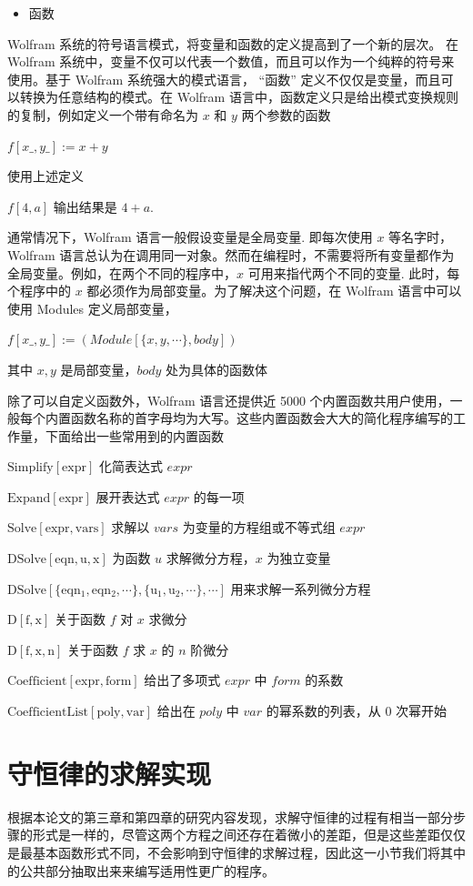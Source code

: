 \begin{itemize}
    \item 函数
\end{itemize}

Wolfram 系统的符号语言模式，将变量和函数的定义提高到了一个新的层次。 在 Wolfram 系统中，变量不仅可以代表一个数值，而且可以作为一个纯粹的符号来使用。基于 Wolfram 系统强大的模式语言， “函数” 定义不仅仅是变量，而且可以转换为任意结构的模式。在 Wolfram 语言中，函数定义只是给出模式变换规则的复制，例如定义一个带有命名为 $x$ 和 $y$ 两个参数的函数

$f[x\_ , y\_ ]:= x + y$

使用上述定义

$f[4, a]$ 输出结果是 $4 + a$.

通常情况下，Wolfram 语言一般假设变量是全局变量. 即每次使用  $x$ 等名字时，Wolfram 语言总认为在调用同一对象。然而在编程时，不需要将所有变量都作为全局变量。例如，在两个不同的程序中，$x$ 可用来指代两个不同的变量. 此时，每个程序中的 $x$ 都必须作为局部变量。为了解决这个问题，在 Wolfram 语言中可以使用  Modules 定义局部变量，

$f[x\_ , y\_ ]:= (Module[\{x, y, \cdots\}, body])$

其中 $x, y$ 是局部变量，$body$ 处为具体的函数体

除了可以自定义函数外，Wolfram 语言还提供近 5000 个内置函数共用户使用，一般每个内置函数名称的首字母均为大写。这些内置函数会大大的简化程序编写的工作量，下面给出一些常用到的内置函数

$\mathrm{Simplify[expr]}$  \quad   化简表达式 $expr$

$\mathrm{Expand[expr]}$ \quad    展开表达式 $expr$ 的每一项

$\mathrm{Solve[expr, vars]}$  \quad 求解以 $vars$ 为变量的方程组或不等式组 $expr$

$\mathrm{DSolve[eqn, u, x]}$ \quad  为函数 $u$ 求解微分方程，$x$ 为独立变量

$\mathrm{DSolve[\{eqn_1, eqn_2, \cdots \}, \{u_1, u_2, \cdots \}, \cdots ]}$ \quad  用来求解一系列微分方程

$\mathrm{D[f,x]}$     \quad  关于函数 $f$ 对 $x$ 求微分

$\mathrm{D[f,{x,n}]}$     \quad     关于函数 $f$ 求 $x$ 的 $n$ 阶微分

$\mathrm{Coefficient[expr, form]}$   \quad  给出了多项式 $expr$ 中 $form$ 的系数

$\mathrm{CoefficientList[poly, var]}$   \quad  给出在 $poly$ 中 $var$ 的幂系数的列表，从 0 次幂开始

\section{守恒律的求解实现}
根据本论文的第三章和第四章的研究内容发现，求解守恒律的过程有相当一部分步骤的形式是一样的，尽管这两个方程之间还存在着微小的差距，但是这些差距仅仅是最基本函数形式不同，不会影响到守恒律的求解过程，因此这一小节我们将其中的公共部分抽取出来来编写适用性更广的程序。
